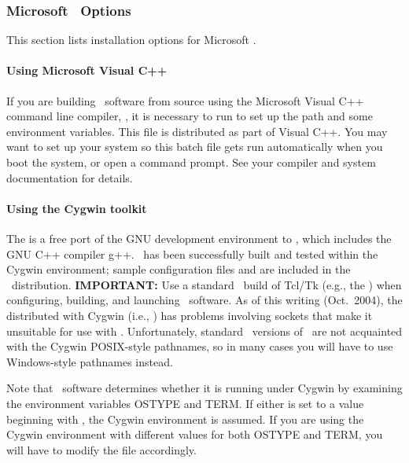 \subsubsection{Microsoft \Windows\ Options}\label{sec:install.windows}

This section lists installation options for Microsoft \Windows.

\paragraph{Using Microsoft Visual C++}
If you are building \OOMMF\ software from source using the Microsoft
Visual C++ command line compiler, , it is necessary to run
 to set up the path and some environment variables.
This file is distributed as part of Visual C++.  You may want to set up
your system so this batch file gets run automatically when you boot the
system, or open a command prompt.  See your compiler and system
documentation for details.

\paragraph{Using the Cygwin toolkit}\label{par:install.cygwin}
The  is a free port of the GNU
development environment to \Windows, which includes the GNU C++ compiler
g++.  \OOMMF\ has been successfully built and
tested within the Cygwin environment; sample configuration files
 and
 are
included in the \OOMMF\ distribution.  \textbf{IMPORTANT:} Use a
standard \Windows\ build of Tcl/Tk (e.g., the
) when
configuring, building, and launching \OOMMF\ software.  As of this
writing (Oct.\ 2004), the  distributed with Cygwin (i.e.,
) has problems involving sockets that make it
unsuitable for use with \OOMMF.  Unfortunately, standard \Windows\
versions of \Tcl\ are not acquainted with the Cygwin POSIX-style
pathnames, so in many cases you will have to use Windows-style pathnames
instead.

Note that \OOMMF\ software determines whether it is running under Cygwin
by examining the environment variables
OSTYPE and
TERM.  If either is set to a value
beginning with \cd{cygwin}, the Cygwin environment is assumed.  If you
are using the Cygwin environment with different values for both OSTYPE
and TERM, you will have to modify the \fn{config/names/cygtel.tcl} file
accordingly.

